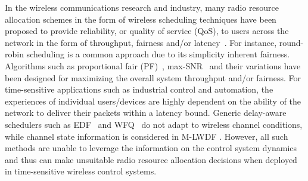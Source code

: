 In the wireless communications research and industry, many radio resource allocation schemes in the form of wireless scheduling techniques have been proposed to provide reliability, or quality of service (QoS), to users across the network in the form of throughput, fairness and/or latency~\cite{cao2001scheduling,wongthavarawat2003packet,fattah2002overview,yaacoub2012survey}. For instance, round-robin scheduling is a common approach due to its simplicity inherent fairness. Algorithms such as proportional fair (PF)~\cite{kim2005proportional}, max-SNR~\cite{knopp1995information} and their variations have been designed for maximizing the overall system throughput and/or fairness. For time-sensitive applications such as industrial control and automation, the experiences of individual users/devices are highly dependent on the ability of the network to deliver their packets within a latency bound. Generic delay-aware schedulers such as EDF~\cite{wu2014analysis} and WFQ~\cite{lu1999fair} do not adapt to wireless channel conditions, while channel state information is considered in M-LWDF \cite{andrews2001providing}. However, all such methods are unable to leverage the information on the control system dynamics and thus can make unsuitable radio resource allocation decisions when deployed in time-sensitive wireless control systems.


